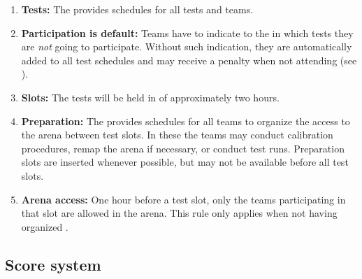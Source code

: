 \begin{enumerate}
	\item \textbf{Tests:} The  provides schedules for all tests and teams. 
	\item \textbf{Participation is default:} Teams have to indicate to the  in which tests they are \emph{not} going to participate. Without such indication, they are automatically added to all test schedules and may receive a penalty when not attending (see ).
	\item \textbf{Slots:} The tests will be held in  of approximately two hours.
	\item \textbf{Preparation:} The  provides schedules for all teams to organize the access to the arena between test slots. In these  the teams may conduct calibration procedures, remap the arena if necessary, or conduct test runs.
	Preparation slots are inserted whenever possible, but may not be available before all test slots. 
	\item \textbf{Arena access:} One hour before a test slot, only the teams participating in that slot are allowed in the arena.
This rule only applies when not having organized .   
\end{enumerate}

\subsection{Score system}
\label{rule:score_system}

